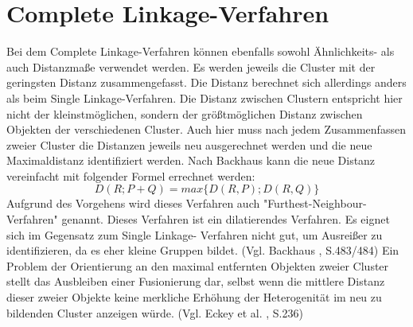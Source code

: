 \section{Complete Linkage-Verfahren}
Bei dem Complete Linkage-Verfahren können ebenfalls sowohl Ähnlichkeits- als auch Distanzmaße verwendet werden. Es werden jeweils die Cluster mit der geringsten Distanz zusammengefasst. Die Distanz berechnet sich allerdings anders als beim Single Linkage-Verfahren. Die Distanz zwischen Clustern entspricht hier nicht der kleinstmöglichen, sondern der größtmöglichen Distanz zwischen Objekten der verschiedenen Cluster. Auch hier muss nach jedem Zusammenfassen zweier Cluster die Distanzen jeweils neu ausgerechnet werden und die neue Maximaldistanz identifiziert werden.
Nach Backhaus \cite{Backhaus.2016} kann die neue Distanz vereinfacht mit folgender Formel errechnet werden:                                                                                                                                                                                                                                                                                                                                                               
\begin{equation}
	D(R;P+Q) = max\{D(R,P);D(R,Q)\}
\end{equation}
Aufgrund des Vorgehens wird dieses Verfahren auch "Furthest-Neighbour-Verfahren" genannt.
Dieses Verfahren ist ein dilatierendes Verfahren. Es eignet sich im Gegensatz zum Single Linkage- Verfahren nicht gut, um Ausreißer zu identifizieren, da es eher kleine Gruppen bildet. (Vgl. Backhaus \cite{Backhaus.2016}, S.483/484) Ein Problem der Orientierung an den maximal entfernten Objekten zweier Cluster stellt das Ausbleiben einer Fusionierung dar, selbst wenn die mittlere Distanz dieser zweier Objekte keine merkliche Erhöhung der Heterogenität im neu zu bildenden Cluster anzeigen würde. (Vgl. Eckey et al. \cite{Eckey.2002}, S.236)

